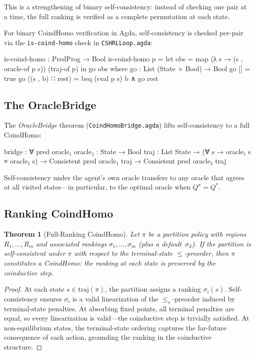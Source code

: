 \documentclass[9pt,a4paper]{article}
\newcommand{\fpath}[1]{\nolinkurl{#1}}
\theoremstyle{plain}
\newtheorem{theorem}{Theorem}
\theoremstyle{definition}
\theoremstyle{remark}
\begin{document}
This is a strengthening of binary self-consistency: instead of
checking one pair at a time, the full ranking is verified as a
complete permutation at each state.

For binary CoindHomo verification in Agda, self-consistency is
checked per-pair via the \texttt{is-coind-homo} check in
\fpath{CSHRLLoop.agda}:

\begin{spec}
is-coind-homo : PredProg → Bool
is-coind-homo p =
  let obs = map (λ s → (s , oracle-of p s)) (traj-of p)
  in go obs
  where
    go : List (State × Bool) → Bool
    go []               = true
    go ((s , b) ∷ rest) = beq (eval p s) b ∧ go rest
\end{spec}

\subsection{The OracleBridge}

The \emph{OracleBridge} theorem
(\fpath{CoindHomoBridge.agda}) lifts self-consistency
to a full CoindHomo:

\begin{spec}
bridge : ∀ {pred oracle₁ oracle₂ : State → Bool}
           {traj : List State} →
         (∀ s → oracle₁ s ≡ oracle₂ s) →
         Consistent pred oracle₁ traj →
         Consistent pred oracle₂ traj
\end{spec}

Self-consistency under the agent's own oracle transfers to
any oracle that agrees at all visited states---in particular,
to the optimal oracle when $Q^\pi = Q^*$.

\subsection{Ranking CoindHomo}

\begin{theorem}[Full-Ranking CoindHomo]
Let $\pi$ be a partition policy with regions
$R_1, \ldots, R_m$ and associated rankings
$\sigma_1, \ldots, \sigma_m$ (plus a default~$\sigma_d$).
If the partition is self-consistent under $\pi$
with respect to the terminal-state $\le$-preorder, then $\pi$
constitutes a CoindHomo: the ranking at each state is
preserved by the coinductive step.
\end{theorem}

\begin{proof}
At each state $s \in \text{traj}(\pi)$, the partition assigns
a ranking $\sigma_i(s)$. Self-consistency ensures
$\sigma_i$ is a valid linearization of the $\le_s$-preorder
induced by terminal-state penalties. At absorbing fixed
points, all terminal penalties are equal, so every
linearization is valid---the coinductive step is trivially
satisfied. At non-equilibrium states, the terminal-state
ordering captures the far-future consequence of each action,
grounding the ranking in the coinductive structure.
\end{proof}
\end{document}
